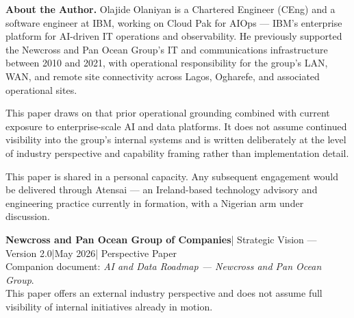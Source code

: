 \documentclass[10pt]{article}
\newcommand{\bigspacer}{\vspace{16pt}}
\begin{document}
\noindent\colorbox{primary!8}{%
\begin{minipage}{\dimexpr\textwidth-2\fboxsep}
  \vspace{6pt}
  \textbf{\color{primary}About the Author.}\quad
  Olajide Olaniyan is a Chartered Engineer (CEng) and a software engineer
  at IBM, working on Cloud Pak for AIOps --- IBM's enterprise platform for
  AI-driven IT operations and observability. He previously supported the
  Newcross and Pan Ocean Group's IT and communications infrastructure
  between 2010 and 2021, with operational responsibility for the group's
  LAN, WAN, and remote site connectivity across Lagos, Ogharefe, and
  associated operational sites.

  \vspace{4pt}
  This paper draws on that prior operational grounding combined with
  current exposure to enterprise-scale AI and data platforms. It does not
  assume continued visibility into the group's internal systems and is
  written deliberately at the level of industry perspective and capability
  framing rather than implementation detail.

  \vspace{4pt}
  This paper is shared in a personal capacity. Any subsequent engagement
  would be delivered through Atensai --- an Ireland-based technology
  advisory and engineering practice currently in formation, with a
  Nigerian arm under discussion.
  \vspace{6pt}
\end{minipage}}

\bigspacer

{\small\color{darkgrey}
\textbf{Newcross and Pan Ocean Group of Companies}\enspace|\enspace
Strategic Vision --- Version 2.0\enspace|\enspace May 2026\enspace|\enspace
Perspective Paper\\
Companion document: \textit{AI and Data Roadmap --- Newcross and Pan Ocean
Group}.\\
This paper offers an external industry perspective and does not assume full
visibility of internal initiatives already in motion.
}
\end{document}
